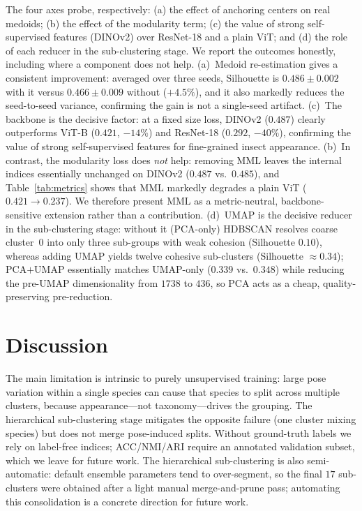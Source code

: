 \documentclass[10pt,a4paper,twocolumn]{article}
\begin{document}
{\sloppy The four axes probe, respectively: (a) the effect of anchoring centers on real medoids; (b) the effect of the modularity term; (c) the value of strong self-supervised features (DINOv2) over ResNet-18 and a plain ViT; and (d) the role of each reducer in the sub-clustering stage. We report the outcomes honestly, including where a component does not help. (a)~Medoid re-estimation gives a consistent improvement: averaged over three seeds, Silhouette is $0.486{\pm}0.002$ with it versus $0.466{\pm}0.009$ without ($+4.5\%$), and it also markedly reduces the seed-to-seed variance, confirming the gain is not a single-seed artifact. (c)~The backbone is the decisive factor: at a fixed size loss, DINOv2 ($0.487$) clearly outperforms ViT-B ($0.421$, $-14\%$) and ResNet-18 ($0.292$, $-40\%$), confirming the value of strong self-supervised features for fine-grained insect appearance. (b)~In contrast, the modularity loss does \emph{not} help: removing MML leaves the internal indices essentially unchanged on DINOv2 ($0.487$ vs.\ $0.485$), and Table~\ref{tab:metrics} shows that MML markedly degrades a plain ViT ($0.421\!\to\!0.237$). We therefore present MML as a metric-neutral, backbone-sensitive extension rather than a contribution. (d)~UMAP is the decisive reducer in the sub-clustering stage: without it (PCA-only) HDBSCAN resolves coarse cluster~0 into only three sub-groups with weak cohesion (Silhouette $0.10$), whereas adding UMAP yields twelve cohesive sub-clusters (Silhouette $\approx\!0.34$); PCA$+$UMAP essentially matches UMAP-only ($0.339$ vs.\ $0.348$) while reducing the pre-UMAP dimensionality from $1738$ to $436$, so PCA acts as a cheap, quality-preserving pre-reduction.}

\section{Discussion}

The main limitation is intrinsic to purely unsupervised training: large pose variation within a single species can cause that species to split across multiple clusters, because appearance---not taxonomy---drives the grouping. The hierarchical sub-clustering stage mitigates the opposite failure (one cluster mixing species) but does not merge pose-induced splits. Without ground-truth labels we rely on label-free indices; ACC/NMI/ARI require an annotated validation subset, which we leave for future work. The hierarchical sub-clustering is also semi-automatic: default ensemble parameters tend to over-segment, so the final $17$ sub-clusters were obtained after a light manual merge-and-prune pass; automating this consolidation is a concrete direction for future work.
\end{document}
